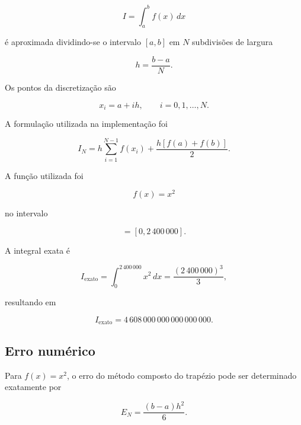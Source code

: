 \begin{equation}
    I = \int_a^b f(x)\,dx
\end{equation}

é aproximada dividindo-se o intervalo \([a,b]\) em \(N\) subdivisões de
largura

\begin{equation}
    h = \frac{b-a}{N}.
\end{equation}

Os pontos da discretização são

\begin{equation}
    x_i = a + ih,
    \qquad i=0,1,\ldots,N.
\end{equation}

A formulação utilizada na implementação foi

\begin{equation}
    I_N =
    h
    \sum_{i=1}^{N-1} f(x_i)
    +
    \frac{
        h[f(a)+f(b)]
    }{2}.
    \label{eq:atvd06-trapezio}
\end{equation}

A função utilizada foi

\begin{equation}
    f(x)=x^2
\end{equation}

no intervalo

\begin{equation}
    [a,b]=[0,2\,400\,000].
\end{equation}

A integral exata é

\begin{equation}
    I_{\text{exato}}
    =
    \int_0^{2\,400\,000}x^2\,dx
    =
    \frac{(2\,400\,000)^3}{3},
\end{equation}

resultando em

\begin{equation}
    I_{\text{exato}}
    =
    4\,608\,000\,000\,000\,000\,000.
    \label{eq:atvd06-integral-exata}
\end{equation}


\subsection{Erro numérico}

Para \(f(x)=x^2\), o erro do método composto do trapézio pode ser
determinado exatamente por

\begin{equation}
    E_N =
    \frac{(b-a)h^2}{6}.
    \label{eq:atvd06-erro}
\end{equation}

